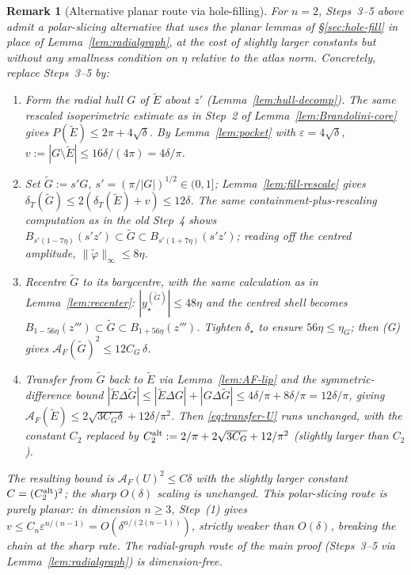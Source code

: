 \documentclass[11pt]{amsart}
\newtheorem{remark}[theorem]{Remark}
\newcommand{\dT}{\delta_T}
\newcommand{\AF}{\mathcal A_F}
\newcommand{\eps}{\varepsilon}
\newcommand{\Etil}{\widetilde E}
\newcommand{\Gtil}{\widetilde G}
\begin{document}
\begin{remark}[Alternative planar route via hole-filling]
\label{rem:planar-alt}
For $n=2$, Steps~3--5 above admit a polar-slicing alternative that
uses the planar lemmas of \S\ref{sec:hole-fill} in place of
Lemma~\ref{lem:radialgraph}, at the cost of slightly larger constants
but without any smallness condition on $\eta$ relative to the atlas
norm.  Concretely, replace Steps~3--5 by:
\begin{enumerate}[label=(\arabic*)]
\item Form the radial hull $G$ of $\Etil$ about $z'$
\textup{(Lemma~\ref{lem:hull-decomp})}.  The same rescaled
isoperimetric estimate as in Step~2 of
Lemma~\ref{lem:Brandolini-core} gives $P(\Etil)\le 2\pi+4\sqrt\delta$.
By Lemma~\ref{lem:pocket} with $\eps=4\sqrt\delta$,
\(v:=|G\setminus\Etil|\le 16\delta/(4\pi)=4\delta/\pi\).
\item Set $\Gtil:=s' G$, $s'=(\pi/|G|)^{1/2}\in(0,1]$;
Lemma~\ref{lem:fill-rescale} gives $\dT(\Gtil)\le 2(\dT(\Etil)+v)
\le 12\delta$.  The same containment-plus-rescaling computation as in
the old Step~4 shows $B_{s'(1-7\eta)}(s' z')\subset\Gtil\subset
B_{s'(1+7\eta)}(s' z')$; reading off the centred amplitude,
$\|\widetilde\varphi\|_\infty\le 8\eta$.
\item Recentre $\Gtil$ to its barycentre, with the same calculation
as in Lemma~\ref{lem:recenter}: $|y_\star^{(\Gtil)}|\le 48\eta$ and
the centred shell becomes $B_{1-56\eta}(z''')\subset\Gtil\subset
B_{1+56\eta}(z''')$.  Tighten $\delta_\star$ to ensure
$56\eta\le\eta_G$; then (G) gives
$\AF(\Gtil)^{2}\le 12 C_G\,\delta$.
\item Transfer from $\Gtil$ back to $\Etil$ via
Lemma~\ref{lem:AF-lip} and the symmetric-difference bound
$|\Etil\Delta\Gtil|\le|\Etil\Delta G|+|G\Delta\Gtil|\le 4\delta/\pi+
8\delta/\pi=12\delta/\pi$, giving
$\AF(\Etil)\le 2\sqrt{3 C_G\delta}+12\delta/\pi^{2}$.  Then
\eqref{eq:transfer-U} runs unchanged, with the constant
$C_2$ replaced by $C_2^{\rm alt}:=2/\pi+2\sqrt{3 C_G}+
12/\pi^{2}$ (slightly larger than $C_2$).
\end{enumerate}
The resulting bound is $\AF(U)^{2}\le C\delta$ with the slightly
larger constant $C=(C_2^{\rm alt})^{2}$; the sharp $O(\delta)$
scaling is unchanged.  This polar-slicing route is purely planar:
in dimension $n\ge 3$, Step~(1) gives $v\le C_n\eps^{n/(n-1)}=
O(\delta^{n/(2(n-1))})$, strictly weaker than $O(\delta)$, breaking
the chain at the sharp rate.  The radial-graph route of the main
proof (Steps~3--5 via Lemma~\ref{lem:radialgraph}) is
dimension-free.
\end{remark}
\end{document}
